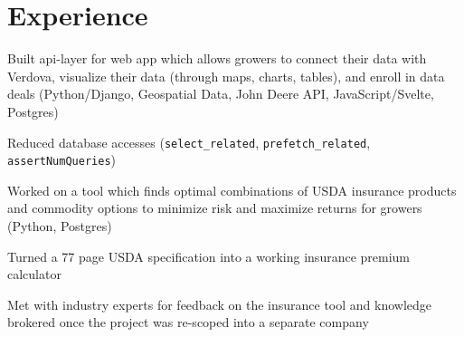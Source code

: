 \documentclass[hidelinks, 11pt]{scrartcl}
\begin{document}
\color{textcolor}

\flushleft
{\Huge\bfseries{\color{mycolor}{Adrian Herath}}}

{\small}







\section{Experience}


{
    \item Built api-layer for web app which allows growers to connect their data with Verdova, visualize their data (through maps, charts, tables),
    and enroll in data deals (Python/Django, Geospatial Data, John Deere API, JavaScript/Svelte, Postgres)

    \item Reduced database accesses (\texttt{select\_related}, \texttt{prefetch\_related}, \texttt{assertNumQueries})

    \item Worked on a tool which finds optimal combinations of USDA insurance products and commodity options
    to minimize risk and maximize returns for growers (Python, Postgres)

    \item Turned a 77 page USDA specification into a working insurance premium calculator

    \item Met with industry experts for feedback on the insurance tool and knowledge brokered once the project was re-scoped into a separate company

}

\end{document}
